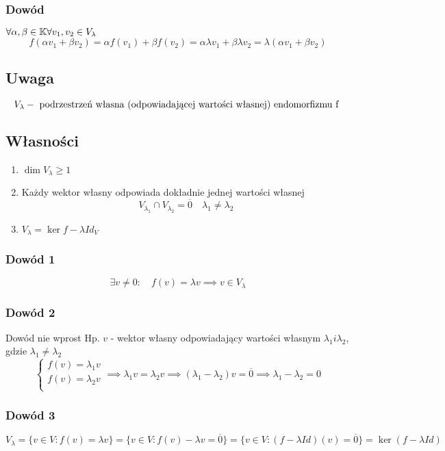 \documentclass[11pt]{article}
\begin{document}
\subsubsection{Dowód}
$ \\
\forall \alpha, \beta \in \mathbb{K} \\
\forall v_1,v_2 \in V_\lambda$
$$ f( \alpha v_1 + \beta v_2 ) = \alpha f(v_1) + \beta f(v_2) = \alpha \lambda v_1 + \beta \lambda v_2 = \lambda (\alpha v_1 + \beta v_2)$$ 
\subsection{Uwaga}
$$V_\lambda - \hbox{ podrzestrzeń własna (odpowiadającej wartości własnej) endomorfizmu f }$$

\subsection{Własności}
\begin{enumerate}
\item{$\dim{V_\lambda} \geq 1$}
\item{Każdy wektor własny odpowiada dokładnie jednej wartości własnej
$$ V_{\lambda_1} \cap V_{\lambda_2} = \overline{0} \quad \lambda_1 \not = \lambda_2 $$}
\item{$V_\lambda = \ker{f - \lambda Id_V}$}
\end{enumerate}
\subsubsection{Dowód 1}
$$ \exists v\not = 0 : \quad f(v) = \lambda v \implies v \in V_\lambda$$

\subsubsection{Dowód 2}
Dowód nie wprost 
Hp. $v$ - wektor własny odpowiadający wartości własnym $\lambda_1 i \lambda_2$, gdzie $\lambda_1 \not = \lambda_2$
$$
\begin{cases}
f(v) = \lambda_1 v \\
f(v) = \lambda_2 v \\
\end{cases}
\implies
\lambda_1 v = \lambda_2 v
\implies
(\lambda_1 - \lambda_2) v = \overline{0}
\implies
\lambda_1 - \lambda_2 = 0
$$

\subsubsection{Dowód 3}
$$ V_\lambda = \{ v \in V : f(v) = \lambda v \} = \{ v \in V : f(v) - \lambda v = \overline{0} \} = \{ v \in V : (f - \lambda Id)(v) = \overline{0} \} = \ker{(f - \lambda Id)} $$
\end{document}
